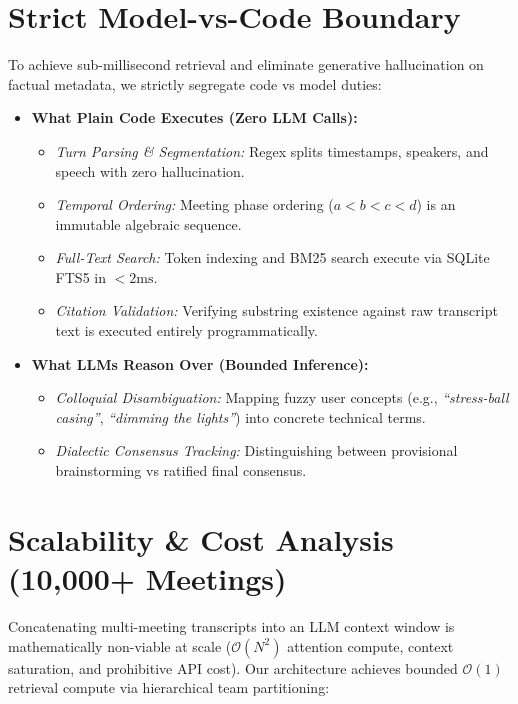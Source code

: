 \documentclass[11pt,a4paper]{article}
\begin{document}
\section{Strict Model-vs-Code Boundary}
To achieve sub-millisecond retrieval and eliminate generative hallucination on factual metadata, we strictly segregate code vs model duties:
\begin{itemize}
    \item \textbf{What Plain Code Executes (Zero LLM Calls):}
    \begin{itemize}
        \item \textit{Turn Parsing \& Segmentation:} Regex splits timestamps, speakers, and speech with zero hallucination.
        \item \textit{Temporal Ordering:} Meeting phase ordering ($a < b < c < d$) is an immutable algebraic sequence.
        \item \textit{Full-Text Search:} Token indexing and BM25 search execute via SQLite FTS5 in $<2\text{ms}$.
        \item \textit{Citation Validation:} Verifying substring existence against raw transcript text is executed entirely programmatically.
    \end{itemize}
    \item \textbf{What LLMs Reason Over (Bounded Inference):}
    \begin{itemize}
        \item \textit{Colloquial Disambiguation:} Mapping fuzzy user concepts (e.g., \textit{``stress-ball casing''}, \textit{``dimming the lights''}) into concrete technical terms.
        \item \textit{Dialectic Consensus Tracking:} Distinguishing between provisional brainstorming vs ratified final consensus.
    \end{itemize}
\end{itemize}

\section{Scalability \& Cost Analysis (10,000+ Meetings)}
Concatenating multi-meeting transcripts into an LLM context window is mathematically non-viable at scale ($\mathcal{O}(N^2)$ attention compute, context saturation, and prohibitive API cost). Our architecture achieves bounded $\mathcal{O}(1)$ retrieval compute via hierarchical team partitioning:
\end{document}
